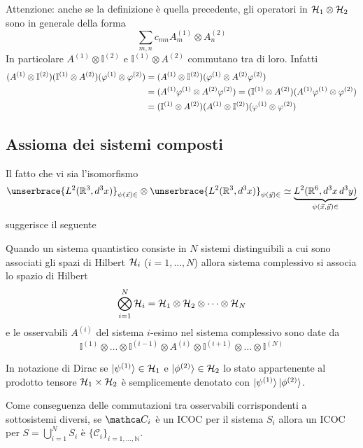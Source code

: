 \documentclass[../../FisicaTeorica.tex]{subfiles}
\begin{document}
\begin{remark}
Attenzione: anche se la definizione è quella precedente, gli operatori in $\mathcal{H}_1 \otimes \mathcal{H}_2$ sono in generale della forma
\[
\sum_{m,n} c_{mn}  A_m^{(1)} \otimes A_n^{(2)}
\]
In particolare $A^{(1)} \otimes \mathbb{I}^{(2)}$ e $\mathbb{I}^{(1)} \otimes A^{(2)}$ commutano tra di loro. Infatti
\begin{align}
(A^{(1)} \otimes \mathbb{I}^{(2)}) (\mathbb{I}^{(1)} \otimes A^{(2)}) (\varphi^{(1)} \otimes \varphi^{(2)}) & = (A^{(1)} \otimes \mathbb{I}^{(2)}) (\varphi^{(1)} \otimes  A^{(2)} \varphi^{(2)}) \notag \\
& = (A^{(1)} \varphi^{(1)} \otimes A^{(2)} \varphi^{(2)}) = (\mathbb{I}^{(1)} \otimes A^{(2)}) (A^{(1)} \varphi^{(1)} \otimes \varphi^{(2)}) \notag \\
& = (\mathbb{I}^{(1)} \otimes A^{(2)}) (A^{(1)} \otimes \mathbb{I}^{(2)}) (\varphi^{(1)} \otimes \varphi^{(2)}) \notag
\end{align}
\end{remark}

\subsection{Assioma dei sistemi composti}

Il fatto che vi sia l’isomorfismo
\[
\unserbrace{L^2(\mathbb R^3, d^3 x)}_{\psi(\vect x) \in} \otimes \unserbrace{L^2(\mathbb R^3, d^3 x)}_{\psi(\vect y) \in} \simeq \underbrace{L^2(\mathbb R^6, d^3 x \, d^3 y)}_{\psi(\vect x, \vect y) \in}
\]
suggerisce il seguente
\begin{axi}
Quando un sistema quantistico consiste in $N$ sistemi distinguibili a cui sono associati gli spazi di Hilbert $\mathcal{H}_i$ ($i = 1, \dots, N$) allora sistema complessivo si associa lo spazio di Hilbert
\[
\bigotimes_{i = 1}^N \mathcal{H}_i = \mathcal{H}_1 \otimes \mathcal{H}_2 \otimes \dots \otimes \mathcal{H}_N
\]
e le osservabili $A^{(i)}$ del sistema $i$-esimo nel sistema complessivo sono date da
\[
\mathbb{I}^{(1)} \otimes \dots \otimes \mathbb{I}^{(i-1)} \otimes A^{(i)} \otimes \mathbb{I}^{(i+1)} \otimes \dots \otimes \mathbb{I}^{(N)}
\]
\end{axi}

\begin{notation}
In notazione di Dirac se $\ket{\psi^{(1)}} \in \mathcal{H}_1$ e $\ket{\phi^{(2)}} \in \mathcal{H}_2$ lo stato appartenente al prodotto tensore $\mathcal{H}_1 \times \mathcal{H}_2$ è semplicemente denotato con $\ket{\psi^{(1)}} \ket{\phi^{(2)}}$.
\end{notation}
\begin{remark}
Come conseguenza delle commutazioni tra osservabili corrispondenti a sottosistemi diversi, se $\mathca C_i$ è un ICOC per il sistema $S_i$ allora un ICOC per $S = \bigcup_{i = 1}^{N} S_i$ è $\{ \mathcal C_i \}_{i = 1, \dots, \mathbb N}$.
\end{remark}
\end{document}
